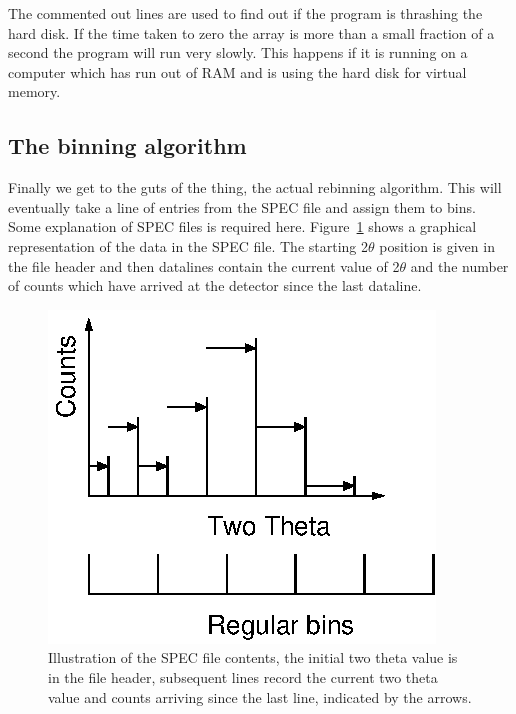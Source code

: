 \documentclass[10pt,a4paper,notitlepage]{article}
\begin{document}
\begin{flushleft}
\begin{minipage}{\linewidth}
\begin{list}{}{\setlength{\itemsep}{-\parsep}\setlength{\itemindent}{-\leftmargin}}
\item{}
\end{list}
\end{minipage}\vspace{4ex}
\end{flushleft}
The commented out lines are used to find out if the program is thrashing 
the hard disk. If the time taken to zero the array is more than a small
fraction of a second the program will run very slowly. This happens if
it is running on a computer which has run out of RAM and is using the
hard disk for virtual memory.

\subsection{The binning algorithm}

Finally we get to the guts of the thing, the actual rebinning algorithm. 
This will eventually take a line of entries from the SPEC file and assign 
them to bins. 
Some explanation of SPEC files is required here. 
Figure~\ref{fig:bin} shows a graphical representation of the data in the 
SPEC file. 
The starting 2$\theta$ position is given in the file header and then datalines contain the current value of 2$\theta$ and the number of counts which
have arrived at the detector since the last dataline.

\begin{figure}[tb]
  \centering
  \includegraphics{bin.eps}
  \caption{Illustration of the SPEC file contents, the initial two theta value
 is in the file header, subsequent lines record the current two theta value
 and counts arriving since the last line, indicated by the arrows.}
  \label{fig:bin}
\end{figure}
\end{document}

